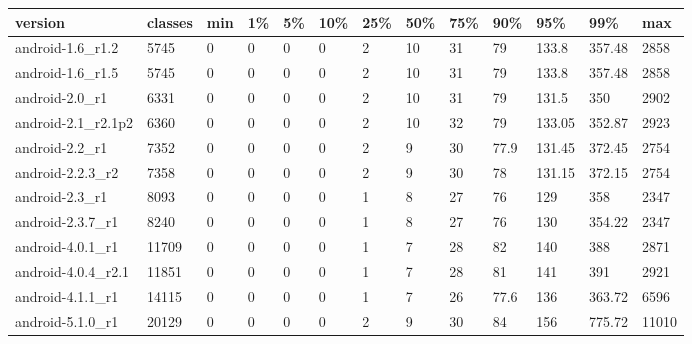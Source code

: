 \begin{tabular}{|l|l|l|l|l|l|l|l|l|l|l|l|l|}
\hline
version&classes&min&1\%&5\%&10\%&25\%&50\%&75\%&90\%&95\%&99\%&max\\
\hline
android-1.6\_r1.2&5745&0&0&0&0&2&10&31&79&133.8&357.48&2858\\
\hline
android-1.6\_r1.5&5745&0&0&0&0&2&10&31&79&133.8&357.48&2858\\
\hline
android-2.0\_r1&6331&0&0&0&0&2&10&31&79&131.5&350&2902\\
\hline
android-2.1\_r2.1p2&6360&0&0&0&0&2&10&32&79&133.05&352.87&2923\\
\hline
android-2.2\_r1&7352&0&0&0&0&2&9&30&77.9&131.45&372.45&2754\\
\hline
android-2.2.3\_r2&7358&0&0&0&0&2&9&30&78&131.15&372.15&2754\\
\hline
android-2.3\_r1&8093&0&0&0&0&1&8&27&76&129&358&2347\\
\hline
android-2.3.7\_r1&8240&0&0&0&0&1&8&27&76&130&354.22&2347\\
\hline
android-4.0.1\_r1&11709&0&0&0&0&1&7&28&82&140&388&2871\\
\hline
android-4.0.4\_r2.1&11851&0&0&0&0&1&7&28&81&141&391&2921\\
\hline
android-4.1.1\_r1&14115&0&0&0&0&1&7&26&77.6&136&363.72&6596\\
\hline
android-5.1.0\_r1&20129&0&0&0&0&2&9&30&84&156&775.72&11010\\
\hline
\end{tabular}
